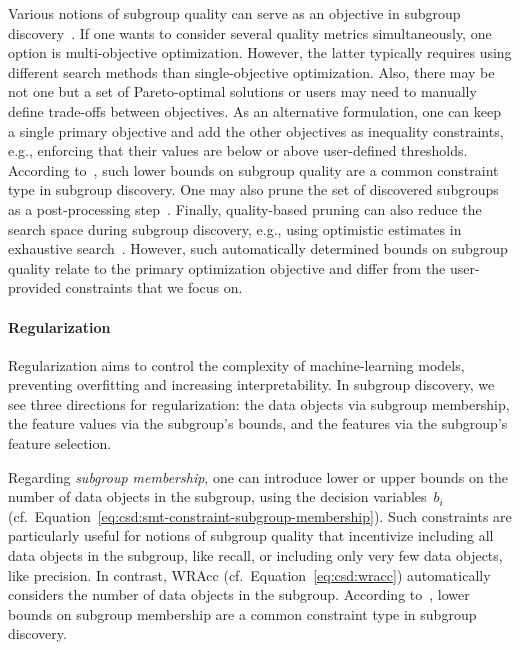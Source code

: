 \documentclass{article}
\theoremstyle{definition}
\begin{document}
Various notions of subgroup quality can serve as an objective in subgroup discovery~\cite{atzmueller2015subgroup, herrera2011overview}.
If one wants to consider several quality metrics simultaneously, one option is multi-objective optimization. However, the latter typically requires using different search methods than single-objective optimization.
Also, there may be not one but a set of Pareto-optimal solutions or users may need to manually define trade-offs between objectives.
As an alternative formulation, one can keep a single primary objective and add the other objectives as inequality constraints, e.g., enforcing that their values are below or above user-defined thresholds.
According to~\cite{meeng2021real}, such lower bounds on subgroup quality are a common constraint type in subgroup discovery.
One may also prune the set of discovered subgroups as a post-processing step~\cite{atzmueller2015subgroup}.
Finally, quality-based pruning can also reduce the search space during subgroup discovery, e.g., using optimistic estimates in exhaustive search~\cite{atzmueller2015subgroup, atzmueller2009fast, grosskreutz2009subgroup}.
However, such automatically determined bounds on subgroup quality relate to the primary optimization objective and differ from the user-provided constraints that we focus on.

\paragraph{Regularization}

Regularization aims to control the complexity of machine-learning models, preventing overfitting and increasing interpretability.
In subgroup discovery, we see three directions for regularization:
the data objects via subgroup membership, the feature values via the subgroup's bounds, and the features via the subgroup's feature selection.

Regarding \emph{subgroup membership}, one can introduce lower or upper bounds on the number of data objects in the subgroup, using the decision variables~$b_i$ (cf.~Equation~\ref{eq:csd:smt-constraint-subgroup-membership}).
Such constraints are particularly useful for notions of subgroup quality that incentivize including all data objects in the subgroup, like recall, or including only very few data objects, like precision.
In contrast, WRAcc (cf.~Equation~\ref{eq:csd:wracc}) automatically considers the number of data objects in the subgroup.
According to~\cite{meeng2021real}, lower bounds on subgroup membership are a common constraint type in subgroup discovery.
\end{document}
